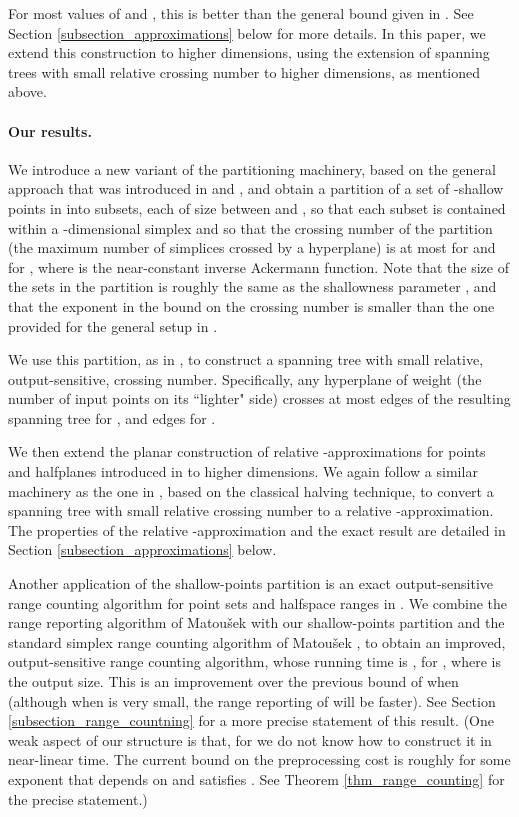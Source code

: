 \documentclass[11pt]{article}
\begin{document}
For most values of  and , this is better than the general bound  given in \cite{lls01}. See Section \ref{subsection_approximations} below for more details. In this paper, we extend this construction to higher dimensions, using the extension of spanning trees with small relative crossing number to higher dimensions, as mentioned above.


\paragraph{Our results.} We introduce a new variant of the partitioning machinery, based on the general approach that was introduced in \cite{mat92a} and
\cite{mat92b}, and obtain a partition of a set  of  -shallow points in  into  subsets, each of size between  and ,
so that each subset is contained within a -dimensional simplex and so that the crossing number of the partition (the maximum number of simplices crossed
by a hyperplane) is at most  for  and  for , where 
is the near-constant inverse Ackermann function. Note that the size of the sets in the partition is roughly the same as the shallowness parameter , and
that the exponent in the bound on the crossing number is smaller than the one provided for the general setup in \cite{mat92a}.

We use this partition, as in \cite{hs11}, to construct a spanning tree with small relative, output-sensitive, crossing number.
Specifically, any hyperplane  of weight  (the number of input points on its ``lighter" side) crosses at most  edges of the resulting spanning tree for , and  edges for .

We then extend the planar construction of relative -approximations for points and halfplanes introduced in \cite{hs11} to higher dimensions. We again
follow a similar machinery as the one in \cite{hs11}, based on the classical halving technique, to convert a spanning tree with small relative crossing
number to a relative -approximation. The properties of the relative -approximation and the exact result are detailed in Section
\ref{subsection_approximations} below.

Another application of the shallow-points partition is an exact output-sensitive range counting algorithm for point sets and halfspace ranges in
. We combine the range reporting algorithm of Matou\v{s}ek \cite{mat92b} with our shallow-points partition and the standard simplex range
counting algorithm of Matou\v{s}ek \cite{mat92a}, to obtain an improved, output-sensitive range counting algorithm, whose running time is , for , where  is the output size. This is an improvement over the previous bound 
of \cite{mat92a} when  (although when  is very small, the range reporting of \cite{mat92b} will be faster). See Section
\ref{subsection_range_countning} for a more precise statement of this result. (One weak aspect of our structure is that, for  we do not know how
to construct it in near-linear time. The current bound on the preprocessing cost is roughly  for some exponent  that depends on  and
satisfies . See Theorem \ref{thm_range_counting} for the precise statement.)
\end{document}

